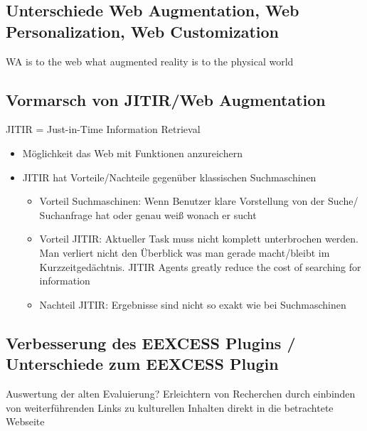 \subsection{Unterschiede Web Augmentation, Web Personalization, Web Customization}
WA is to the web what augmented reality is to the physical world

\subsection{Vormarsch von JITIR/Web Augmentation}
JITIR = Just-in-Time Information Retrieval
\begin{itemize}
	\item Möglichkeit das Web mit Funktionen anzureichern
	\item JITIR hat Vorteile/Nachteile gegenüber klassischen Suchmaschinen
		\begin{itemize}
			\item Vorteil Suchmaschinen: Wenn Benutzer klare Vorstellung von der Suche/ Suchanfrage hat oder genau weiß wonach er sucht
			\item Vorteil JITIR: Aktueller Task muss nicht komplett unterbrochen werden. Man verliert nicht den Überblick was man gerade macht/bleibt im Kurzzeitgedächtnis. JITIR Agents greatly reduce the cost of searching for information 
			\item Nachteil JITIR: Ergebnisse sind nicht so exakt wie bei Suchmaschinen
		\end{itemize}
\end{itemize}

\subsection{Verbesserung des EEXCESS Plugins / Unterschiede zum EEXCESS Plugin}
Auswertung der alten Evaluierung?
Erleichtern von Recherchen durch einbinden von weiterführenden Links zu kulturellen Inhalten direkt in die betrachtete Webseite
